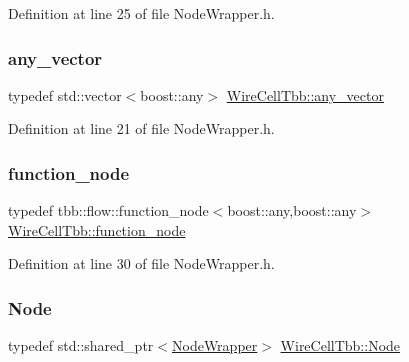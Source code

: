 Definition at line 25 of file Node\+Wrapper.\+h.

\mbox{\label{namespace_wire_cell_tbb_a5da2a89721f83af1aff5d0ce11ed8c44}} 
\subsubsection{\texorpdfstring{any\+\_\+vector}{any\_vector}}
{\footnotesize\ttfamily typedef std\+::vector$<$boost\+::any$>$ \hyperlink{namespace_wire_cell_tbb_a5da2a89721f83af1aff5d0ce11ed8c44}{Wire\+Cell\+Tbb\+::any\+\_\+vector}}



Definition at line 21 of file Node\+Wrapper.\+h.

\mbox{\label{namespace_wire_cell_tbb_a61220b5d8f4185012c87d8bd7eb02909}} 
\subsubsection{\texorpdfstring{function\+\_\+node}{function\_node}}
{\footnotesize\ttfamily typedef tbb\+::flow\+::function\+\_\+node$<$boost\+::any,boost\+::any$>$ \hyperlink{namespace_wire_cell_tbb_a61220b5d8f4185012c87d8bd7eb02909}{Wire\+Cell\+Tbb\+::function\+\_\+node}}



Definition at line 30 of file Node\+Wrapper.\+h.

\mbox{\label{namespace_wire_cell_tbb_aa7b6ff37a20e0174babf0614286bb59f}} 
\subsubsection{\texorpdfstring{Node}{Node}}
{\footnotesize\ttfamily typedef std\+::shared\+\_\+ptr$<$\hyperlink{class_wire_cell_tbb_1_1_node_wrapper}{Node\+Wrapper}$>$ \hyperlink{namespace_wire_cell_tbb_aa7b6ff37a20e0174babf0614286bb59f}{Wire\+Cell\+Tbb\+::\+Node}}




